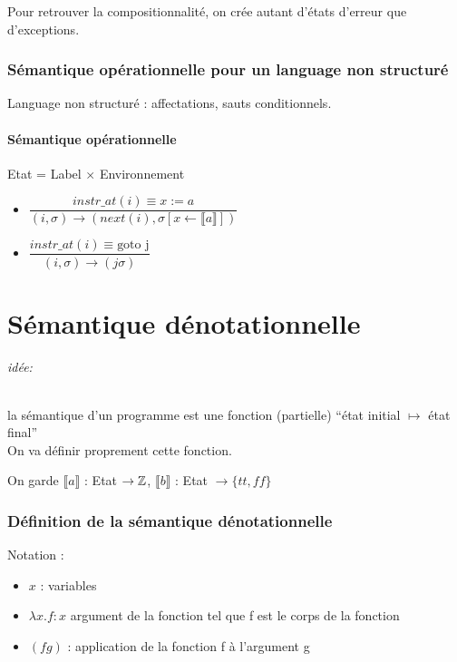 \documentclass[10pt,a4paper]{article}
\newcommand{\sem}[1]{$\llbracket #1 \rrbracket$}
\newcommand{\semm}[1]{\llbracket #1 \rrbracket }
\begin{document}
Pour retrouver la compositionnalité, on crée autant d'états d'erreur que d'exceptions.

\section{Sémantique opérationnelle pour un language non structuré}
Language non structuré : affectations, sauts conditionnels.

\subsection{Sémantique opérationnelle}
Etat = Label $\times$ Environnement\\

\begin{itemize}
\item $\dfrac{instr\_at(i) \equiv x:=a }{(i, \sigma) \rightarrow (next(i), \sigma[x \leftarrow \semm{a}])}$\\
\item $\dfrac{instr\_at(i) \equiv \text{goto j} }{(i, \sigma) \rightarrow (j \sigma)}$
\end{itemize}

\part{Sémantique dénotationnelle}
\paragraph{idée:} la sémantique d'un programme est une fonction (partielle) ``état initial $\mapsto$ état final''\\
On va définir proprement cette fonction.

On garde \sem{a} : Etat $\rightarrow \mathbb{Z}$, \sem{b} : Etat $\rightarrow \{tt, ff \}$

\section{Définition de la sémantique dénotationnelle}
Notation :\begin{itemize}
           \item $x$ : variables
           \item $\lambda x . f : x$  argument de la fonction tel que f est le corps de la fonction
           \item $(f g)$ : application de la fonction f à l'argument g
          \end{itemize}
\end{document}
